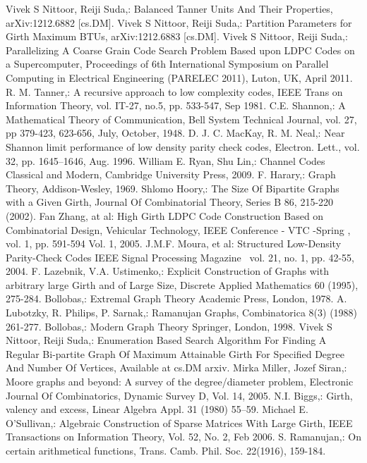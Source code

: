\documentclass{llncs}
\begin{document}
\begin{thebibliography}{[MT1]}
\bibitem[1]{}
Vivek S Nittoor, Reiji Suda,:
Balanced Tanner Units And Their Properties,
arXiv:1212.6882 [cs.DM].
\bibitem[2]{}
Vivek S Nittoor, Reiji Suda,:
Partition Parameters for Girth Maximum  BTUs,
arXiv:1212.6883 [cs.DM].
\bibitem[3]{}
Vivek S Nittoor, Reiji Suda,:
Parallelizing A Coarse Grain Code Search Problem Based upon LDPC Codes on a Supercomputer,
Proceedings of 6th International Symposium on Parallel Computing in Electrical Engineering (PARELEC 2011), Luton, UK, April 2011.
\bibitem[4]{}
R. M. Tanner,:
A recursive approach to low complexity codes,
IEEE Trans on Information Theory, vol. IT-27, no.5, pp. 533-547, Sep 1981. 
\bibitem[5]{}
C.E. Shannon,:
A Mathematical Theory of Communication,
Bell System Technical Journal, vol. 27, pp 379-423, 623-656, July, October, 1948.
\bibitem[6]{}
D. J. C. MacKay, R. M. Neal,:
Near Shannon limit performance of low density parity check codes,
 Electron. Lett., vol. 32, pp. 1645--1646, Aug. 1996.
\bibitem[7]{}
William E. Ryan, Shu Lin,:
Channel Codes Classical and Modern,
Cambridge University Press, 2009.
\bibitem[8]{}
F. Harary,:
Graph Theory,
Addison-Wesley, 1969.
\bibitem[9]{}
Shlomo Hoory,:
The Size Of Bipartite Graphs with a Given Girth,
Journal Of Combinatorial Theory, Series B 86, 215-220 (2002).
\bibitem[10]{}
Fan Zhang, at al:
High Girth LDPC Code Construction Based on Combinatorial Design,
Vehicular Technology, IEEE Conference - VTC -Spring , vol. 1, pp. 591-594 Vol. 1, 2005.
\bibitem[11]{}
J.M.F. Moura, et al:
Structured Low-Density Parity-Check Codes
IEEE Signal Processing Magazine \ vol. 21, no. 1, pp. 42-55, 2004.
\bibitem[12]{}
F. Lazebnik, V.A. Ustimenko,:
Explicit Construction of Graphs with arbitrary large Girth and of Large Size,
Discrete Applied Mathematics 60 (1995), 275-284.
\bibitem[13]{}
Bollobas,:
Extremal Graph Theory
Academic Press, London, 1978.
\bibitem[14]{}
A. Lubotzky, R. Philips, P. Sarnak,:
Ramanujan Graphs,
Combinatorica 8(3) (1988) 261-277.
\bibitem[15]{}
Bollobas,:
Modern Graph Theory
Springer, London, 1998.
\bibitem[16]{}
Vivek S Nittoor, Reiji Suda,:
Enumeration Based Search Algorithm For Finding A Regular Bi-partite Graph Of Maximum Attainable Girth For Specified Degree And Number Of Vertices,
Available at cs.DM arxiv.
\bibitem[17]{}
Mirka Miller, Jozef Siran,:
Moore graphs and beyond: A survey of the degree/diameter problem,
Electronic Journal Of Combinatorics, Dynamic Survey D, Vol. 14, 2005.
\bibitem[18]{}
N.I. Biggs,:
Girth, valency and excess,
 Linear Algebra Appl. 31 (1980) 55–59.
\bibitem[19]{}
Michael E. O’Sullivan,:
Algebraic Construction of Sparse Matrices With Large Girth,
IEEE Transactions on Information Theory, Vol. 52, No. 2, Feb 2006.
\bibitem[19]{}
S. Ramanujan,:
On certain arithmetical functions,
Trans. Camb. Phil. Soc. 22(1916), 159-184.

\end{thebibliography}
\end{document}
